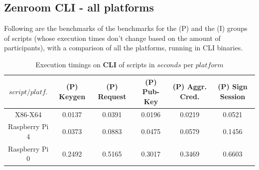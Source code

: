 \documentclass[twocolumn]{article}
\begin{document}
\subsection*{Zenroom CLI - all platforms}

Following are the benchmarks of the benchmarks for the (P) and the (I) groups of scripts (whose execution times don't change based on the amount of participants), with a comparison of all the platforms, running in CLI binaries.




\begin{table}[h!]
  \begin{center}
    \caption{Execution timings on \textbf{CLI} of scripts in $seconds$ per $platform$}
      \label{tab:table1}
        \begin{tabular} {c|c|c|c|c|c}
          \toprule
\textbf{$script / platf.$} & \textbf{(P) Keygen} & \textbf{(P) Request} & \textbf{(P) Pub-Key} & \textbf{(P) Aggr. Cred.} & \textbf{(P) Sign Session} \\
          \midrule
			X86-X64	&	0.0137	&	0.0391	&	0.0196	&	0.0219	&	0.0521		\\
Raspberry Pi 4	&	0.0373	&	0.0883	&	0.0475	&	0.0579	&	0.1456		\\
Raspberry Pi  0	&	0.2492	&	0.5165	&	0.3017	&	0.3469	&	0.6603		\\
      \bottomrule %
    \end{tabular}
  \end{center}
\end{table}
\end{document}
